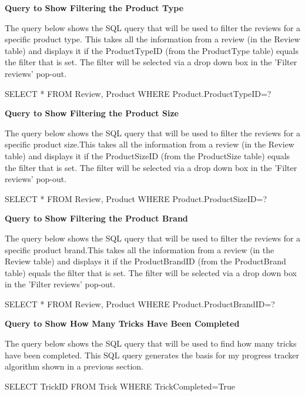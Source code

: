 \textbf{Query to Show Filtering the Product Type}

The query below shows the SQL query that will be used to filter the reviews for a specific product type. This takes all the information from a review (in the Review table) and displays it if the ProductTypeID (from the ProductType table) equals the filter that is set. The filter will be selected via a drop down box in the 'Filter reviews' pop-out.
\begin{sql}
SELECT * 
FROM Review, Product
WHERE Product.ProductTypeID=?
\end{sql}



\textbf{Query to Show Filtering the Product Size}

The query below shows the SQL query that will be used to filter the reviews for a specific product size.This takes all the information from a review (in the Review table) and displays it if the ProductSizeID (from the ProductSize table) equals the filter that is set. The filter will be selected via a drop down box in the 'Filter reviews' pop-out.
\begin{sql}
SELECT * 
FROM Review, Product
WHERE Product.ProductSizeID=?
\end{sql}



\textbf{Query to Show Filtering the Product Brand}

The query below shows the SQL query that will be used to filter the reviews for a specific product brand.This takes all the information from a review (in the Review table) and displays it if the ProductBrandID (from the ProductBrand table) equals the filter that is set. The filter will be selected via a drop down box in the 'Filter reviews' pop-out.
\begin{sql}
SELECT * 
FROM Review, Product
WHERE Product.ProductBrandID=?
\end{sql}



\textbf{Query to Show How Many Tricks Have Been Completed}

The query below shows the SQL query that will be used to find how many tricks have been completed. This SQL query generates the basis for my progress tracker algorithm shown in a previous section.

\begin{sql}
SELECT TrickID
FROM Trick
WHERE TrickCompleted=True
\end{sql}



